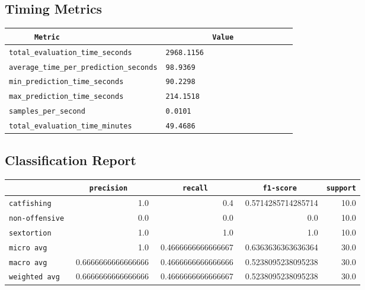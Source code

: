 \documentclass{article}
\begin{document}
\subsection{Timing Metrics}

\begin{center}
\begin{tabular}{l | l} \hline
    \verb|      Metric     | & \verb|           Value           | \\ \hline
    \hline
    \verb|total_evaluation_time_seconds| & \verb|2968.1156                    | \\ \hline
    \verb|average_time_per_prediction_seconds| & \verb|98.9369                      | \\ \hline
    \verb|min_prediction_time_seconds| & \verb|90.2298                      | \\ \hline
    \verb|max_prediction_time_seconds| & \verb|214.1518                     | \\ \hline
    \verb|samples_per_second| & \verb|0.0101                       | \\ \hline
    \verb|total_evaluation_time_minutes| & \verb|49.4686                      | \\ \hline
\end{tabular}
\end{center}

\subsection{Classification Report}

\begin{center}
\begin{tabular}{l | r | r | r | r} \hline
    \verb|            | & \verb|    precision     | & \verb|      recall      | & \verb|     f1-score     | & \verb|support| \\ \hline
    \hline
    \verb|catfishing | & 1.0 & 0.4 & 0.5714285714285714 &    10.0 \\ \hline
    \verb|non-offensive| & 0.0 & 0.0 & 0.0 &    10.0 \\ \hline
    \verb|sextortion | & 1.0 & 1.0 & 1.0 &    10.0 \\ \hline
    \verb|micro avg  | & 1.0 & 0.4666666666666667 & 0.6363636363636364 &    30.0 \\ \hline
    \verb|macro avg  | & 0.6666666666666666 & 0.4666666666666666 & 0.5238095238095238 &    30.0 \\ \hline
    \verb|weighted avg| & 0.6666666666666666 & 0.4666666666666667 & 0.5238095238095238 &    30.0 \\ \hline
\end{tabular}
\end{center}
\end{document}
